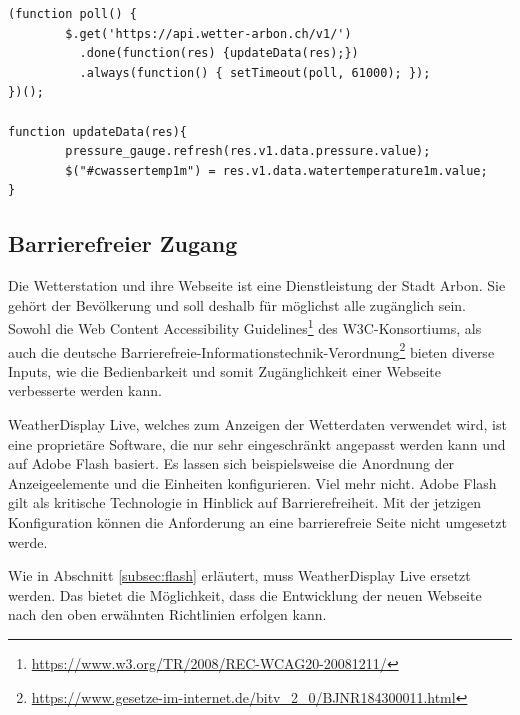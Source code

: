 \begin{lstlisting}[label=lst:poll,caption=Automatische Aktualisierung der Werte, language=html]
(function poll() {
        $.get('https://api.wetter-arbon.ch/v1/')
          .done(function(res) {updateData(res);})
          .always(function() { setTimeout(poll, 61000); });
})();

function updateData(res){
        pressure_gauge.refresh(res.v1.data.pressure.value);
        $("#cwassertemp1m") = res.v1.data.watertemperature1m.value;
}

\end{lstlisting}


\subsection{Barrierefreier Zugang}
Die Wetterstation und ihre Webseite ist eine Dienstleistung der Stadt Arbon. Sie gehört der Bevölkerung und soll deshalb für möglichst alle zugänglich sein. Sowohl die \flqq Web Content Accessibility Guidelines\frqq\footnote{ \url{https://www.w3.org/TR/2008/REC-WCAG20-20081211/}} des W3C-Konsortiums, als auch die deutsche \flqq  Barrierefreie-Informationstechnik-Verordnung\frqq\footnote{ \url{https://www.gesetze-im-internet.de/bitv_2_0/BJNR184300011.html}} bieten diverse Inputs, wie die Bedienbarkeit und somit Zugänglichkeit einer Webseite verbesserte werden kann.
\newline

\noindent
WeatherDisplay Live, welches zum Anzeigen der Wetterdaten verwendet wird, ist eine proprietäre Software, die nur sehr eingeschränkt angepasst werden kann und auf Adobe Flash basiert. Es lassen sich beispielsweise die Anordnung der Anzeigeelemente und die Einheiten konfigurieren. Viel mehr nicht.  Adobe Flash gilt als kritische Technologie in Hinblick auf Barrierefreiheit. Mit der jetzigen Konfiguration können die Anforderung an eine barrierefreie Seite nicht umgesetzt werde.
\newline

\noindent
Wie in Abschnitt \ref{subsec:flash} erläutert, muss WeatherDisplay Live ersetzt werden. Das bietet die Möglichkeit, dass die Entwicklung der neuen Webseite nach den oben erwähnten Richtlinien erfolgen kann.

